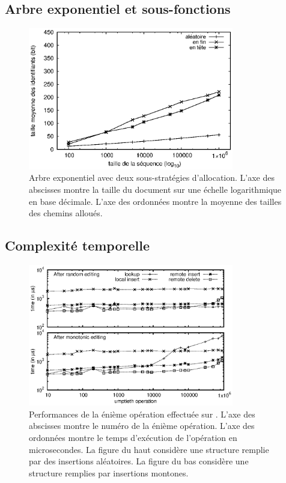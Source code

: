 \subsection{Arbre exponentiel et sous-fonctions}

\begin{figure}
  \begin{center}
    \includegraphics[width=0.8\textwidth]{img/lseq/lseq.eps}
    \caption{\label{repl:img:lseq} Arbre exponentiel avec deux sous-stratégies
      d'allocation. L'axe des abscisses montre la taille du document sur une
      échelle logarithmique en base décimale. L'axe des ordonnées montre la
      moyenne des tailles des chemins alloués.}
  \end{center}
\end{figure}


\subsection{Complexité temporelle}

\begin{figure}
  \begin{center}
    \includegraphics[width=0.8\textwidth]{img/lseq/time.eps}
    \caption{\label{repl:img:time} Performances de la énième opération effectuée
      sur \LSEQ. L'axe des abscisses montre le numéro de la énième
      opération. L'axe des ordonnées montre le temps d'exécution de l'opération
      en microsecondes. La figure du haut considère une structure remplie par
      des insertions aléatoires. La figure du bas considère une structure
      remplies par insertions montones.}
  \end{center}
\end{figure}

